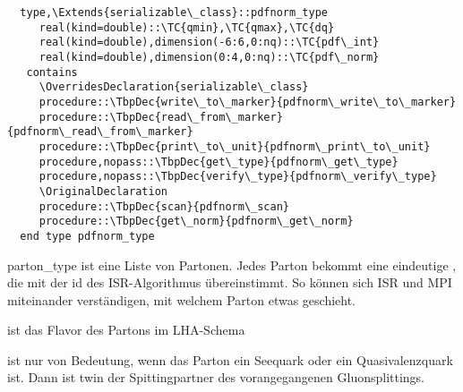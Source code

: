 
\begin{Verbatim}
  type,\Extends{serializable\_class}::pdfnorm_type
     real(kind=double)::\TC{qmin},\TC{qmax},\TC{dq}
     real(kind=double),dimension(-6:6,0:nq)::\TC{pdf\_int}
     real(kind=double),dimension(0:4,0:nq)::\TC{pdf\_norm}
   contains
     \OverridesDeclaration{serializable\_class}
     procedure::\TbpDec{write\_to\_marker}{pdfnorm\_write\_to\_marker}
     procedure::\TbpDec{read\_from\_marker}{pdfnorm\_read\_from\_marker}
     procedure::\TbpDec{print\_to\_unit}{pdfnorm\_print\_to\_unit}
     procedure,nopass::\TbpDec{get\_type}{pdfnorm\_get\_type}
     procedure,nopass::\TbpDec{verify\_type}{pdfnorm\_verify\_type}
     \OriginalDeclaration
     procedure::\TbpDec{scan}{pdfnorm\_scan}
     procedure::\TbpDec{get\_norm}{pdfnorm\_get\_norm}
  end type pdfnorm_type
\end{Verbatim}
parton\_type ist eine Liste von Partonen. Jedes Parton bekommt eine eindeutige , die mit der id des ISR-Algorithmus übereinstimmt. So können sich ISR und MPI miteinander verständigen, mit welchem Parton etwas geschieht.

 ist das Flavor des Partons im LHA-Schema


 ist nur von Bedeutung, wenn das Parton ein Seequark oder ein Quasivalenzquark ist. Dann ist twin der Spittingpartner des vorangegangenen Gluonsplittings.

